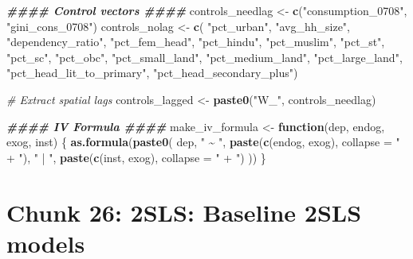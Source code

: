 \documentclass[
]{article}
\newenvironment{Shaded}{\begin{snugshade}}{\end{snugshade}}
\newcommand{\AttributeTok}[1]{\textcolor[rgb]{0.13,0.29,0.53}{#1}}
\newcommand{\CommentTok}[1]{\textcolor[rgb]{0.56,0.35,0.01}{\textit{#1}}}
\newcommand{\ControlFlowTok}[1]{\textcolor[rgb]{0.13,0.29,0.53}{\textbf{#1}}}
\newcommand{\DocumentationTok}[1]{\textcolor[rgb]{0.56,0.35,0.01}{\textbf{\textit{#1}}}}
\newcommand{\FunctionTok}[1]{\textcolor[rgb]{0.13,0.29,0.53}{\textbf{#1}}}
\newcommand{\NormalTok}[1]{#1}
\newcommand{\OtherTok}[1]{\textcolor[rgb]{0.56,0.35,0.01}{#1}}
\newcommand{\StringTok}[1]{\textcolor[rgb]{0.31,0.60,0.02}{#1}}
\begin{document}
\begin{Shaded}
\begin{Highlighting}[]
\DocumentationTok{\#\#\#\# Control vectors \#\#\#\#}
\NormalTok{controls\_needlag }\OtherTok{\textless{}{-}} \FunctionTok{c}\NormalTok{(}\StringTok{"consumption\_0708"}\NormalTok{, }\StringTok{"gini\_cons\_0708"}\NormalTok{)}
\NormalTok{controls\_nolag }\OtherTok{\textless{}{-}} \FunctionTok{c}\NormalTok{( }
  \StringTok{"pct\_urban"}\NormalTok{, }\StringTok{"avg\_hh\_size"}\NormalTok{, }\StringTok{"dependency\_ratio"}\NormalTok{,}
  \StringTok{"pct\_fem\_head"}\NormalTok{, }
  \StringTok{"pct\_hindu"}\NormalTok{, }\StringTok{"pct\_muslim"}\NormalTok{, }
  \StringTok{"pct\_st"}\NormalTok{, }\StringTok{"pct\_sc"}\NormalTok{, }\StringTok{"pct\_obc"}\NormalTok{, }
  \StringTok{"pct\_small\_land"}\NormalTok{, }\StringTok{"pct\_medium\_land"}\NormalTok{, }\StringTok{"pct\_large\_land"}\NormalTok{, }
  \StringTok{"pct\_head\_lit\_to\_primary"}\NormalTok{, }
  \StringTok{"pct\_head\_secondary\_plus"}\NormalTok{)}

\CommentTok{\# Extract spatial lags}
\NormalTok{controls\_lagged }\OtherTok{\textless{}{-}} \FunctionTok{paste0}\NormalTok{(}\StringTok{"W\_"}\NormalTok{, controls\_needlag)}


\DocumentationTok{\#\#\#\# IV Formula \#\#\#\#}
\NormalTok{make\_iv\_formula }\OtherTok{\textless{}{-}} \ControlFlowTok{function}\NormalTok{(dep, endog, exog, inst) \{}
  \FunctionTok{as.formula}\NormalTok{(}\FunctionTok{paste0}\NormalTok{(}
\NormalTok{    dep, }\StringTok{" \textasciitilde{} "}\NormalTok{,}
    \FunctionTok{paste}\NormalTok{(}\FunctionTok{c}\NormalTok{(endog, exog), }\AttributeTok{collapse =} \StringTok{" + "}\NormalTok{),}
    \StringTok{" | "}\NormalTok{,}
    \FunctionTok{paste}\NormalTok{(}\FunctionTok{c}\NormalTok{(inst, exog), }\AttributeTok{collapse =} \StringTok{" + "}\NormalTok{)}
\NormalTok{  ))}
\NormalTok{\}}
\end{Highlighting}
\end{Shaded}

\section*{Chunk 26: 2SLS: Baseline 2SLS models}\label{chunk-26-2sls-baseline-2sls-models}
\end{document}
